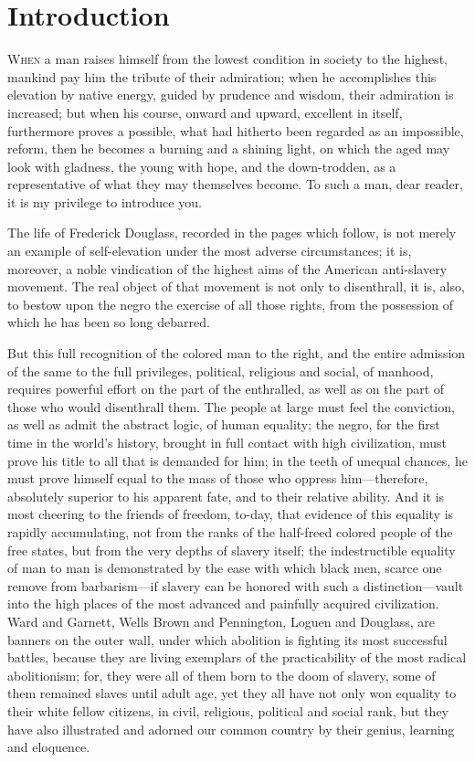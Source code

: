 \chapter{Introduction}

\textsc{When} a man raises himself from the lowest condition in society
to the highest, mankind pay him the tribute of their admiration; when he
accomplishes this elevation by native energy, guided by prudence and
wisdom, their admiration is increased; but when his course, onward and
upward, excellent in itself, furthermore proves a possible, what had
hitherto been regarded as an impossible, reform, then he becomes a
burning and a shining light, on which the aged may look with gladness,
the young with hope, and the down-trodden, as a representative of what
they may themselves become. To such a man, dear reader, it is my
privilege to introduce you.

The life of Frederick Douglass, recorded in the pages which follow, is
not merely an example of self-elevation under the most adverse
circumstances; it is, moreover, a noble vindication of the highest aims
of the American anti-slavery movement. The real object of that movement
is not only to disenthrall, it is, also, to bestow upon the negro the
exercise of all those rights, from the possession of which he has been
so long debarred.

But this full recognition of the colored man to the right, and the
entire admission of the same to the full privileges, political,
religious and social, of manhood, requires powerful effort on the part
of the enthralled, as well as on the part of those who would disenthrall
them. The people at large must feel the conviction, as well as admit the
abstract logic, of human equality; the negro, for the first time in the
world's history, brought in full contact with high civilization, must
prove his title to all that is demanded for him; in the teeth of unequal
chances, he must prove himself equal to the mass of those who oppress
him---therefore, absolutely superior to his apparent fate, and to their
relative ability. And it is most cheering to the friends of freedom,
to-day, that evidence of this equality is {}rapidly accumulating, not
from the ranks of the half-freed colored people of the free states, but
from the very depths of slavery itself; the indestructible equality of
man to man is demonstrated by the ease with which black men, scarce one
remove from barbarism---if slavery can be honored with such a
distinction---vault into the high places of the most advanced and
painfully acquired civilization. Ward and Garnett, Wells Brown and
Pennington, Loguen and Douglass, are banners on the outer wall, under
which abolition is fighting its most successful battles, because they
are living exemplars of the practicability of the most radical
abolitionism; for, they were all of them born to the doom of slavery,
some of them remained slaves until adult age, yet they all have not only
won equality to their white fellow citizens, in civil, religious,
political and social rank, but they have also illustrated and adorned
our common country by their genius, learning and eloquence.

